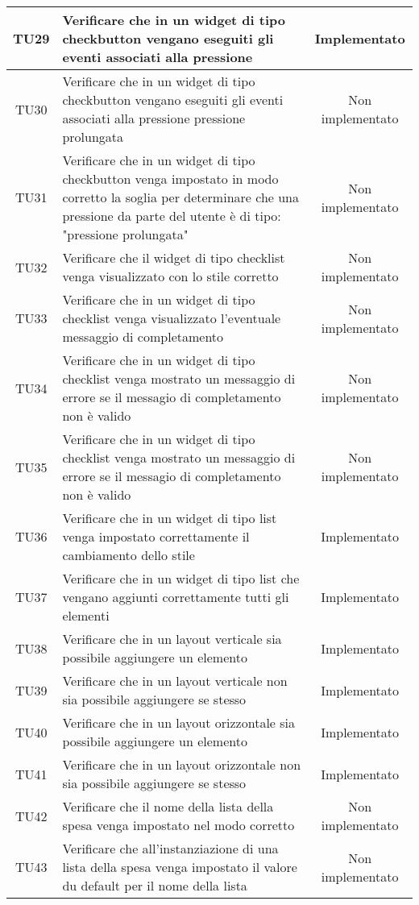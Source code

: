 \begin{center}
\begin{longtable}{|c|>{\centering}m{10cm}|c|}
		TU29 & Verificare che in un widget di tipo checkbutton vengano eseguiti gli eventi associati alla pressione & Implementato \\ \hline
		TU30 & Verificare che in un widget di tipo checkbutton vengano eseguiti gli eventi associati alla pressione pressione prolungata & Non implementato \\ \hline
		TU31 & Verificare che in un widget di tipo checkbutton venga impostato in modo corretto la soglia per determinare che una pressione da parte del utente è di tipo: "pressione prolungata" & Non implementato \\ \hline
		TU32 & Verificare che il widget di tipo checklist venga visualizzato con lo stile corretto & Non implementato \\ \hline
		TU33 & Verificare che in un widget di tipo checklist venga visualizzato l'eventuale messaggio di completamento & Non implementato \\ \hline
		TU34 & Verificare che in un widget di tipo checklist venga mostrato un messaggio di errore se il messagio di completamento non è valido & Non implementato \\ \hline
		TU35 & Verificare che in un widget di tipo checklist venga mostrato un messaggio di errore se il messagio di completamento non è valido & Non implementato \\ \hline
		TU36 & Verificare che in un widget di tipo list venga impostato correttamente il cambiamento dello stile & Implementato \\ \hline
		TU37 & Verificare che in un widget di tipo list che vengano aggiunti correttamente tutti gli elementi & Implementato \\ \hline
		TU38 & Verificare che in un layout verticale sia possibile aggiungere un elemento & Implementato \\ \hline
		TU39 & Verificare che in un layout verticale non sia possibile aggiungere se stesso & Implementato \\ \hline
		TU40 & Verificare che in un layout orizzontale sia possibile aggiungere un elemento & Implementato \\ \hline
		TU41 & Verificare che in un layout orizzontale non sia possibile aggiungere se stesso & Implementato \\ \hline
		TU42 & Verificare che il nome della lista della spesa venga impostato nel modo corretto & Non implementato \\ \hline
		TU43 & Verificare che all'instanziazione di una lista della spesa venga impostato il valore du default per il nome della lista & Non implementato \\ \hline

\end{longtable}
\end{center}
